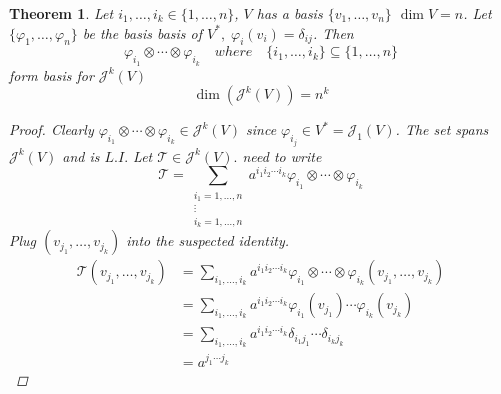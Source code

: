 \documentclass[11pt]{article}
\newtheorem{theorem}{Theorem}[section]
\begin{document}
\begin{theorem}
Let $i_1,\dots , i_k \in \{1,\dots, n\}$, $V$ has a basis $\{v_1, \dots , v_n\}$ $\dim V = n$. Let $\{\varphi_1, \dots , \varphi_n\}$ be the basis basis of $V^{*}, \; \varphi_i(v_i)=\delta_{ij}$. Then
\[\varphi_{i_1}\otimes \cdots \otimes \varphi_{i_k} \quad where \quad \{i_1, \dots ,i_k\} \subseteq \{1, \dots , n\}\]
form basis for $\mathcal{J}^k(V)$
\[\dim(\mathcal{J}^k(V)) = n^k\]
\begin{proof}
Clearly $\varphi_{i_1}\otimes \cdots \otimes \varphi_{i_k} \in \mathcal{J}^k(V)$ since $\varphi_{i_j} \in V^* = \mathcal{J}_1(V)$. The set spans $\mathcal{J}^k(V)$ and is $L.I.$ Let $\mathcal{T} \in \mathcal{J}^k(V).$ need to write
\[\mathcal{T} = \sum_{\substack{
i_1 = 1,\dots , n \\
\vdots\\
i_k = 1,\dots , n 
}} a^{i_1i_2\cdots i_k}\varphi_{i_1}\otimes\cdots\otimes\varphi_{i_k}\]
Plug $(v_{j_1}, \dots , v_{j_k})$ into the suspected identity.
\begin{align*}\mathcal{T}(v_{j_1}, \dots , v_{j_k}) &= \sum\limits_{i_1,\dots , i_k}a^{i_1i_2\cdots i_k}\varphi_{i_1}\otimes\cdots\otimes\varphi_{i_k}(v_{j_1}, \dots , v_{j_k}) \\
&= \sum\limits_{i_1,\dots , i_k}a^{i_1i_2\cdots i_k}\varphi_{i_1}(v_{j_1})\cdots\varphi_{i_k}(v_{j_k})\\
&= \sum\limits_{i_1,\dots , i_k}a^{i_1i_2\cdots i_k}\delta_{i_1 j_1}\cdots\delta_{i_k j_k}\\
&= a^{j_1\cdots j_k} \end{align*}


\end{proof}
\end{theorem}
\end{document}
